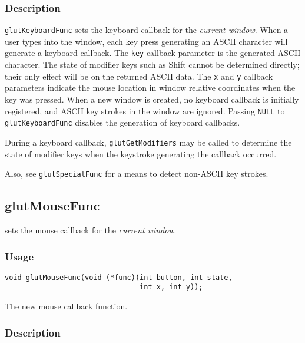\subsubsection*{Description}

{\tt glutKeyboardFunc} sets the keyboard callback for the {\em current window}.
When a user types into the window, each key press generating an ASCII character
will generate a keyboard callback.  The {\tt key} callback parameter is the 
generated ASCII character.  The state of modifier keys such as Shift cannot be
determined directly; their only effect will be on the returned ASCII data.
The {\tt x} and {\tt y} callback
parameters indicate the mouse location in window relative coordinates
when the key was pressed.  When a new window is created, no keyboard
callback is initially registered, and ASCII key strokes in the window are
ignored.  
Passing {\tt NULL} to {\tt glutKeyboardFunc} disables
the generation of keyboard callbacks.

During a keyboard callback, {\tt glutGetModifiers} may be called to determine
the state of modifier keys when the keystroke generating the callback occurred.

Also, see {\tt glutSpecialFunc} for a means to detect non-ASCII key strokes.

\subsection{glutMouseFunc}

 sets the mouse callback for the {\em current window}.

\subsubsection*{Usage}

\begin{verbatim}
void glutMouseFunc(void (*func)(int button, int state,
                                int x, int y));
\end{verbatim}
\begin{description}
\itemsep 0in
\item[{\tt func}]
The new mouse callback function.
\end{description}

\subsubsection*{Description}

